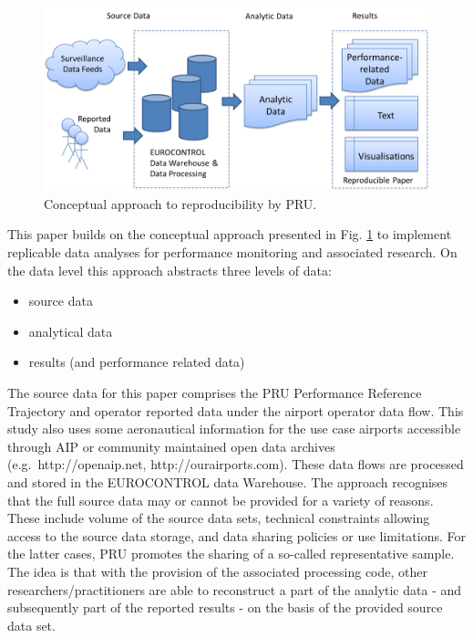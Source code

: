 \documentclass[conference,final,a4paper,]{IEEEtran}
\providecommand{\tightlist}{%
  \setlength{\itemsep}{0pt}\setlength{\parskip}{0pt}}
\begin{document}
\begin{figure}[hbt]

{\centering \includegraphics[width=1\linewidth]{figures/approach-stages} 

}

\caption{Conceptual approach to reproducibility by PRU.}\label{fig:concept-approach}
\end{figure}

This paper builds on the conceptual approach presented in Fig.
\ref{fig:concept-approach} to implement replicable data analyses for
performance monitoring and associated research. On the data level this
approach abstracts three levels of data:

\begin{itemize}
\tightlist
\item
  source data
\item
  analytical data
\item
  results (and performance related data)
\end{itemize}

The source data for this paper comprises the PRU Performance Reference
Trajectory and operator reported data under the airport operator data
flow. This study also uses some aeronautical information for the use
case airports accessible through AIP or community maintained open data
archives (e.g.~http://openaip.net, http://ourairports.com). These data
flows are processed and stored in the EUROCONTROL data Warehouse. The
approach recognises that the full source data may or cannot be provided
for a variety of reasons. These include volume of the source data sets,
technical constraints allowing access to the source data storage, and
data sharing policies or use limitations. For the latter cases, PRU
promotes the sharing of a so-called representative sample. The idea is
that with the provision of the associated processing code, other
researchers/practitioners are able to reconstruct a part of the analytic
data - and subsequently part of the reported results - on the basis of
the provided source data set.
\end{document}

